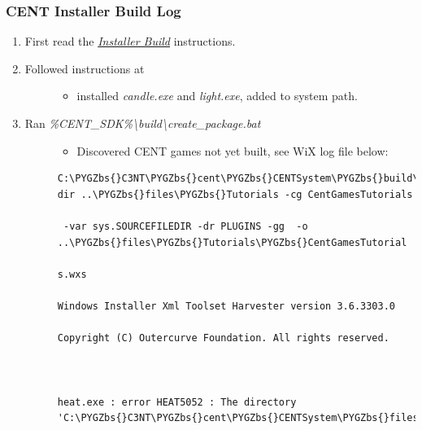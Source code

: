 \documentclass[letterpaper,10pt,english]{sphinxmanual}
\def\PYGZbs{\char`\\}
\begin{document}
\subsubsection{CENT Installer Build Log}
\label{index:inst-build-log}\label{index:cent-installer-build-log}\begin{enumerate}
\item {} 
First read the {\hyperref[index:installer-build]{\emph{Installer Build}}} instructions.

\item {} \begin{description}
\item[{Followed instructions at }] \leavevmode\begin{itemize}
\item {} 
installed \emph{candle.exe} and \emph{light.exe}, added to system path.

\end{itemize}

\end{description}

\item {} \begin{description}
\item[{Ran \emph{\%CENT\_SDK\%\textbackslash{}build\textbackslash{}create\_package.bat}}] \leavevmode\begin{itemize}
\item {} 
Discovered CENT games not yet built, see WiX log file below:

\end{itemize}

\begin{Verbatim}[commandchars=\\\{\}]
C:\PYGZbs{}C3NT\PYGZbs{}cent\PYGZbs{}CENTSystem\PYGZbs{}build\textgreater{}heat dir ..\PYGZbs{}files\PYGZbs{}Tutorials -cg CentGamesTutorials

 -var sys.SOURCEFILEDIR -dr PLUGINS -gg  -o ..\PYGZbs{}files\PYGZbs{}Tutorials\PYGZbs{}CentGamesTutorial

s.wxs

Windows Installer Xml Toolset Harvester version 3.6.3303.0

Copyright (C) Outercurve Foundation. All rights reserved.



heat.exe : error HEAT5052 : The directory 'C:\PYGZbs{}C3NT\PYGZbs{}cent\PYGZbs{}CENTSystem\PYGZbs{}files\PYGZbs{}Tutoria


\end{Verbatim}
\end{description}
\end{enumerate}
\end{document}
